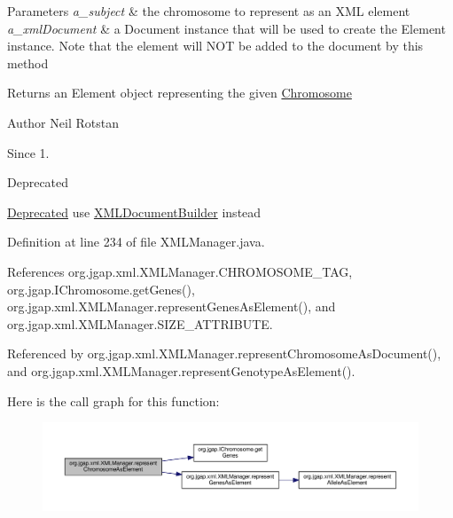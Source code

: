 \begin{DoxyParams}{Parameters}
{\em a\-\_\-subject} & the chromosome to represent as an X\-M\-L element \\
\hline
{\em a\-\_\-xml\-Document} & a Document instance that will be used to create the Element instance. Note that the element will N\-O\-T be added to the document by this method \\
\hline
\end{DoxyParams}
\begin{DoxyReturn}{Returns}
an Element object representing the given \hyperlink{classorg_1_1jgap_1_1_chromosome}{Chromosome}
\end{DoxyReturn}
\begin{DoxyAuthor}{Author}
Neil Rotstan 
\end{DoxyAuthor}
\begin{DoxySince}{Since}
1. 
\end{DoxySince}
\begin{DoxyRefDesc}{Deprecated}
\item[\hyperlink{deprecated__deprecated000014}{Deprecated}]use \hyperlink{classorg_1_1jgap_1_1xml_1_1_x_m_l_document_builder}{X\-M\-L\-Document\-Builder} instead \end{DoxyRefDesc}


Definition at line 234 of file X\-M\-L\-Manager.\-java.



References org.\-jgap.\-xml.\-X\-M\-L\-Manager.\-C\-H\-R\-O\-M\-O\-S\-O\-M\-E\-\_\-\-T\-A\-G, org.\-jgap.\-I\-Chromosome.\-get\-Genes(), org.\-jgap.\-xml.\-X\-M\-L\-Manager.\-represent\-Genes\-As\-Element(), and org.\-jgap.\-xml.\-X\-M\-L\-Manager.\-S\-I\-Z\-E\-\_\-\-A\-T\-T\-R\-I\-B\-U\-T\-E.



Referenced by org.\-jgap.\-xml.\-X\-M\-L\-Manager.\-represent\-Chromosome\-As\-Document(), and org.\-jgap.\-xml.\-X\-M\-L\-Manager.\-represent\-Genotype\-As\-Element().



Here is the call graph for this function\-:
\nopagebreak
\begin{figure}[H]
\begin{center}
\leavevmode
\includegraphics[width=350pt]{classorg_1_1jgap_1_1xml_1_1_x_m_l_manager_a6da62b7bb444f46df933d355239983f0_cgraph}
\end{center}
\end{figure}


